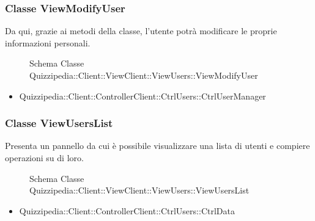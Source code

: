 \subsubsection{Classe ViewModifyUser}
Da qui, grazie ai metodi della classe, l'utente potrà modificare le proprie informazioni personali.
\begin{figure}[H]
\centering
\noindent{}
\caption{Schema Classe Quizzipedia::Client::ViewClient::ViewUsers::ViewModifyUser}
\end{figure}
\begin{itemize}
\item Quizzipedia::Client::ControllerClient::CtrlUsers::CtrlUserManager
\end{itemize}
\subsubsection{Classe ViewUsersList}
Presenta un pannello da cui è possibile visualizzare una lista di utenti e compiere operazioni su di loro.
\begin{figure}[H]
\centering
\noindent{}
\caption{Schema Classe Quizzipedia::Client::ViewClient::ViewUsers::ViewUsersList}
\end{figure}
\begin{itemize}
\item Quizzipedia::Client::ControllerClient::CtrlUsers::CtrlData
\end{itemize}
